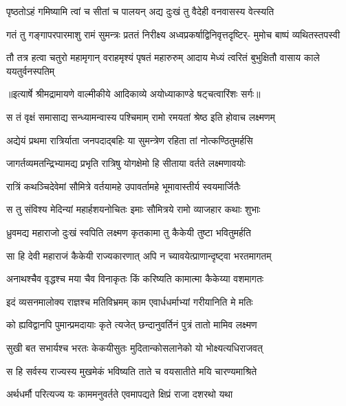 \twolineshloka
{पृष्ठतोऽहं गमिष्यामि त्वां च सीतां च पालयन्}
{अद्य दुःखं तु वैदेही वनवासस्य वेत्स्यति} %

\fourlineindentedshloka
{गतं तु गङ्गापरपारमाशु}
{रामं सुमन्त्रः प्रततं निरीक्ष्य}
{अध्वप्रकर्षाद्विनिवृत्तदृष्टिर्-}
{मुमोच बाष्पं व्यथितस्तपस्वी} %

\fourlineindentedshloka
{तौ तत्र हत्वा चतुरो महामृगान्}
{वराहमृश्यं पृषतं महारुरुम्}
{आदाय मेध्यं त्वरितं बुभुक्षितौ}
{वासाय काले ययतुर्वनस्पतिम्} %


{॥इत्यार्षे श्रीमद्रामायणे वाल्मीकीये आदिकाव्ये अयोध्याकाण्डे षट्चत्वारिंशः सर्गः॥}


\twolineshloka
{स तं वृक्षं समासाद्य सन्ध्यामन्वास्य पश्चिमाम्}
{रामो रमयतां श्रेष्ठ इति होवाच लक्ष्मणम्} %

\twolineshloka
{अद्येयं प्रथमा रात्रिर्याता जनपदाद्बहिः}
{या सुमन्त्रेण रहिता तां नोत्कण्ठितुमर्हसि} %

\twolineshloka
{जागर्तव्यमतन्द्रिभ्यामद्य प्रभृति रात्रिषु}
{योगक्षेमो हि सीताया वर्तते लक्ष्मणावयोः} %

\twolineshloka
{रात्रिं कथञ्चिदेवेमां सौमित्रे वर्तयामहे}
{उपावर्तामहे भूमावास्तीर्य स्वयमार्जितैः} %

\twolineshloka
{स तु संविश्य मेदिन्यां महार्हशयनोचितः}
{इमाः सौमित्रये रामो व्याजहार कथाः शुभाः} %

\twolineshloka
{ध्रुवमद्य महाराजो दुःखं स्वपिति लक्ष्मण}
{कृतकामा तु कैकेयी तुष्टा भवितुमर्हति} %

\twolineshloka
{सा हि देवी महाराजं कैकेयी राज्यकारणात्}
{अपि न च्यावयेत्प्राणान्दृष्ट्वा भरतमागतम्} %

\twolineshloka
{अनाथश्चैव वृद्धश्च मया चैव विनाकृतः}
{किं करिष्यति कामात्मा कैकेय्या वशमागतः} %

\twolineshloka
{इदं व्यसनमालोक्य राज्ञश्च मतिविभ्रमम्}
{काम एवार्धधर्माभ्यां गरीयानिति मे मतिः} %

\twolineshloka
{को ह्यविद्वानपि पुमान्प्रमदायाः कृते त्यजेत्}
{छन्दानुवर्तिनं पुत्रं तातो मामिव लक्ष्मण} %

\twolineshloka
{सुखी बत सभार्यश्च भरतः केकयीसुतः}
{मुदितान्कोसलानेको यो भोक्ष्यत्यधिराजवत्} %

\twolineshloka
{स हि सर्वस्य राज्यस्य मुखमेकं भविष्यति}
{ताते च वयसातीते मयि चारण्यमाश्रिते} %

\twolineshloka
{अर्थधर्मौ परित्यज्य यः काममनुवर्तते}
{एवमापद्यते क्षिप्रं राजा दशरथो यथा} %

